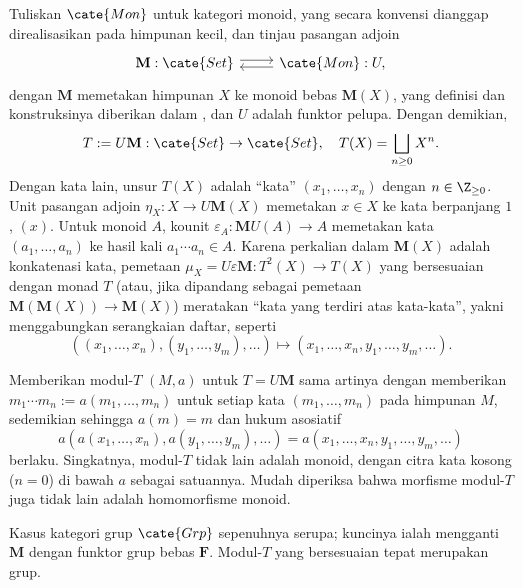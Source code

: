 \begin{example}\label{eg:Mon-monad}
	Tuliskan $\cate{Mon}$ untuk kategori monoid, yang secara konvensi dianggap
	direalisasikan pada himpunan kecil, dan tinjau pasangan adjoin
	\[\begin{tikzcd}
		\mathbf{M}: \cate{Set} \arrow[r, shift left] & \cate{Mon}: U, \arrow[l, shift left]
	\end{tikzcd}\]
	dengan $\mathbf{M}$ memetakan himpunan $X$ ke monoid bebas
	$\mathbf{M}(X)$, yang definisi dan konstruksinya diberikan dalam
	\cite[Definisi 4.8.1, Lema 4.8.4]{Li1}, dan $U$ adalah funktor pelupa.
	Dengan demikian,
	\[ T := U\mathbf{M}: \cate{Set} \to \cate{Set}, \quad T(X) = \bigsqcup_{n \geq 0} X^n. \]
	Dengan kata lain, unsur $T(X)$ adalah ``kata''
	$(x_1,\ldots,x_n)$ dengan $n\in\Z_{\geq0}$. Unit pasangan adjoin
	$\eta_X:X\to U\mathbf{M}(X)$ memetakan $x\in X$ ke kata berpanjang $1$,
	$(x)$. Untuk monoid $A$, kounit
	$\varepsilon_A:\mathbf{M}U(A)\to A$ memetakan kata
	$(a_1,\ldots,a_n)$ ke hasil kali $a_1\cdots a_n\in A$. Karena perkalian
	dalam $\mathbf{M}(X)$ adalah konkatenasi kata, pemetaan
	$\mu_X=U\varepsilon\mathbf{M}:T^2(X)\to T(X)$ yang bersesuaian dengan monad
	$T$ (atau, jika dipandang sebagai pemetaan
	$\mathbf{M}(\mathbf{M}(X))\to\mathbf{M}(X)$) meratakan ``kata yang
	terdiri atas kata-kata'', yakni menggabungkan serangkaian daftar, seperti
	\[ \left( (x_1, \ldots, x_n), (y_1, \ldots, y_m), \ldots \right) \mapsto \left( x_1, \ldots, x_n, y_1, \ldots, y_m, \ldots \right). \]

	Memberikan modul-$T$ $(M,a)$ untuk $T=U\mathbf{M}$ sama artinya dengan
	memberikan $m_1\cdots m_n:=a(m_1,\ldots,m_n)$ untuk setiap kata
	$(m_1,\ldots,m_n)$ pada himpunan $M$, sedemikian sehingga $a(m)=m$ dan
	hukum asosiatif
	\[ a\left( a(x_1, \ldots, x_n), a(y_1, \ldots, y_m), \ldots \right) = a\left( x_1, \ldots, x_n, y_1, \ldots, y_m, \ldots \right) \]
	berlaku. Singkatnya, modul-$T$ tidak lain adalah monoid, dengan citra kata
	kosong ($n=0$) di bawah $a$ sebagai satuannya. Mudah diperiksa bahwa
	morfisme modul-$T$ juga tidak lain adalah homomorfisme monoid.

	Kasus kategori grup $\cate{Grp}$ sepenuhnya serupa; kuncinya ialah mengganti
	$\mathbf{M}$ dengan funktor grup bebas $\mathbf{F}$. Modul-$T$ yang
	bersesuaian tepat merupakan grup.
\end{example}


